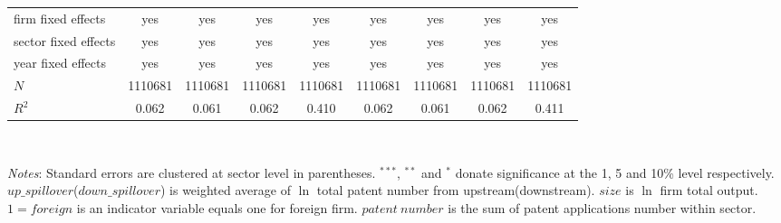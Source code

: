 \documentclass[12pt]{article}%
\begin{document}
\begin{CJK*}{GBK}{fs}
\begin{table}
{{{\begin{tabular}{l*{8}{c}}
firm fixed effects      &     yes         &       yes&     yes     &      yes&      yes        &     yes&    yes     &     yes\\
sector fixed effects      &     yes         &       yes&     yes     &      yes&      yes        &     yes&    yes     &     yes\\
year fixed effects      &     yes         &       yes&     yes     &      yes&      yes        &     yes&    yes     &     yes\\

\hline
\(N\)       &     1110681         &     1110681         &     1110681         &     1110681         &     1110681         &     1110681         &     1110681         &     1110681         \\
\(R^{2}\)   &       0.062         &       0.061         &       0.062         &       0.410         &       0.062         &       0.061         &       0.062         &       0.411         \\
\hline\hline
\end{tabular}
}\\
}
}
\scriptsize {
\par \emph{Notes}: Standard errors are clustered at sector level in parentheses. $^{***}$, $^{**}$ and $^{*}$ donate significance at the 1, 5 and 10\% level respectively. $up\_spillover$($down\_spillover$) is weighted average of $\ln$ total patent number from upstream(downstream). $size$ is $\ln$ firm total output. $1=foreign$ is an indicator variable equals one for foreign firm. $patent~number$ is the sum of patent applications number within sector.}
\end{table}
\clearpage




\end{CJK*}
\end{document}
